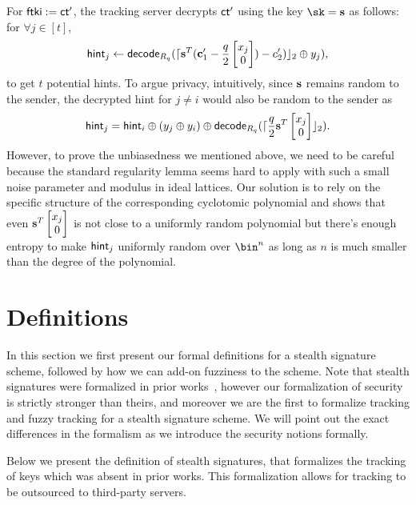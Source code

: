 For $\mathsf{ftki}:=\mathsf{ct}'$, the tracking server decrypts $\mathsf{ct}'$ using the key $\sk=\sn$ as follows: for $\forall j\in[t]$,
$$\mathsf{hint}_j\gets\mathsf{decode}_{R_q}(\lceil\mathbf{s}^T(\mathbf{c}'_1-\frac{q}{2}\begin{bmatrix}x_j\\0\end{bmatrix})-c'_2)\rfloor_2 \oplus y_j),$$
to get $t$ potential hints. To argue privacy, intuitively, since $\mathbf{s}$ remains random to the sender, the decrypted hint for $j\ne i$ would also be random to the sender as 
$$\mathsf{hint}_j=\mathsf{hint}_i\oplus(y_j\oplus y_i)\oplus\mathsf{decode}_{R_q}( \lceil\frac{q}{2}\mathbf{s}^T\begin{bmatrix}x_j\\0\end{bmatrix}\rfloor_2).$$ However, to prove the unbiasedness we mentioned above, we need to be careful because the standard regularity lemma seems hard to apply with such a small noise parameter and modulus in ideal lattices. Our solution is to rely on the specific structure of the corresponding cyclotomic polynomial and shows that even $\mathbf{s}^T\begin{bmatrix}x_j\\0\end{bmatrix}$ is not close to a uniformly random polynomial but there's enough entropy to make $\mathsf{hint}_j$ uniformly random over $\bin^n$ as long as $n$ is much smaller than the degree of the polynomial. 

\section{Definitions}
\label{sec:def}
In this section we first present our formal definitions for a stealth signature scheme, followed by how we can add-on fuzziness to the scheme.
Note that stealth signatures were formalized in prior works~\cite{EUROSP:LYWNW19, ESORICS:LLNYY20}, however our formalization of security is strictly stronger than theirs, and moreover we are the first to formalize tracking and fuzzy tracking for a stealth signature scheme. We will point out the exact differences in the 
formalism as we introduce the security notions formally.

Below we present the definition of stealth signatures, that formalizes the  tracking of keys which was absent in prior works. 
This formalization allows for tracking to be outsourced to third-party servers.

